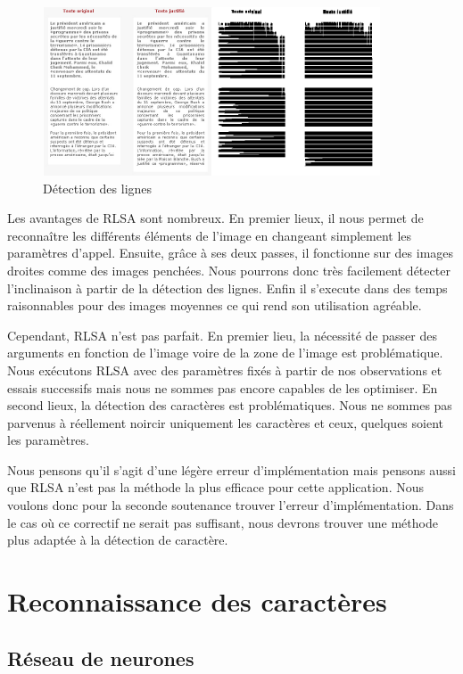 \documentclass[11pt]{report}
\begin{document}
\begin{figure}[htbp]
\centering
\includegraphics[width=10cm]{rlsa.png}
\caption{Détection des lignes}
\end{figure}

Les avantages de RLSA sont nombreux. En premier lieux, il nous permet de reconnaître les différents éléments de l'image en changeant simplement les paramètres d'appel. Ensuite, grâce à ses deux passes, il fonctionne sur des images droites comme des images penchées. Nous pourrons donc très facilement détecter l'inclinaison à partir de la détection des lignes. Enfin il s'execute dans des temps raisonnables pour des images moyennes ce qui rend son utilisation agréable.

Cependant, RLSA n'est pas parfait. En premier lieu, la nécessité de passer des arguments en fonction de l'image voire de la zone de l'image est problématique. Nous exécutons RLSA avec des paramètres fixés à partir de nos observations et essais successifs mais nous ne sommes pas encore capables de les optimiser. En second lieux, la détection des caractères est problématiques. Nous ne sommes pas parvenus à réellement noircir uniquement les caractères et ceux, quelques soient les paramètres.

Nous pensons qu'il s'agit d'une légère erreur d'implémentation mais pensons aussi que RLSA n'est pas la méthode la plus efficace pour cette application. Nous voulons donc pour la seconde soutenance trouver l'erreur d'implémentation. Dans le cas où ce correctif ne serait pas suffisant, nous devrons trouver une méthode plus adaptée à la détection de caractère.


\chapter{Reconnaissance des caractères}

\section{Réseau de neurones}
\end{document}
